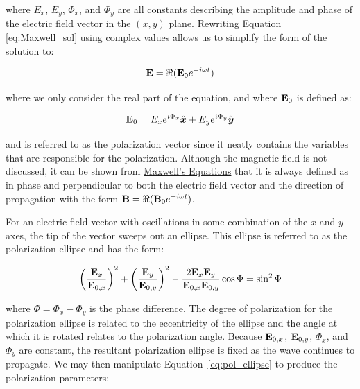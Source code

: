 \noindent where $E_{x}$, $E_{y}$, $\Phi_{x}$, and $\Phi_{y}$ are all constants describing the amplitude and phase of the electric field vector in the $(x, y)$ plane. Rewriting Equation \ref{eq:Maxwell_sol} using complex values allows us to simplify the form of the solution to:

\begin{equation}
    \mathbf{E} = \Re(\mathbf{E}_{0} e^{-i \omega t})
    \label{eq:E_field_vector}
\end{equation}

\noindent where we only consider the real part of the equation, and where $\mathbf{E}_{0}$ is defined as:

\begin{equation}
    \mathbf{E}_{0} = E_{x} e^{i \Phi_{x}} \hat{\boldsymbol{x}} +
    E_{y} e^{i \Phi_{y}} \hat{\boldsymbol{y}}
    \label{eq:pol_vector}
\end{equation}

\noindent and is referred to as the polarization vector since it neatly contains the variables that are responsible for the polarization. Although the magnetic field is not discussed, it can be shown from \hyperref[eq:Maxwell]{Maxwell's Equations} that it is always defined as in phase and perpendicular to both the electric field vector and the direction of propagation with the form $\mathbf{B} = \Re(\mathbf{B}_{0} e^{-i \omega t})$.
\prgph

For an electric field vector with oscillations in some combination of the $x$ and $y$ axes, the tip of the vector sweeps out an ellipse. This ellipse is referred to as the polarization ellipse and has the form:

\begin{equation}
    \left( \frac{\mathbf{E}_{x}}{\mathbf{E}_{0, x}}\right)^{2} +
    \left( \frac{\mathbf{E}_{y}}{\mathbf{E}_{0, y}}\right)^{2} -
    \frac{2 \mathbf{E}_{x} \mathbf{E}_{y}}{\mathbf{E}_{0, x} \mathbf{E}_{0, y}} \cos\Phi =
    \sin^{2} \Phi
    \label{eq:pol_ellipse}
\end{equation}

\noindent where $\Phi = \Phi_{x} - \Phi_{y}$ is the phase difference. The degree of polarization for the polarization ellipse is related to the eccentricity of the ellipse and the angle at which it is rotated relates to the polarization angle. Because $\mathbf{E}_{0, x}$, $\mathbf{E}_{0, y}$, $\Phi_{x}$, and $\Phi_{y}$ are constant, the resultant polarization ellipse is fixed as the wave continues to propagate. We may then manipulate Equation~\ref{eq:pol_ellipse} to produce the polarization parameters:

